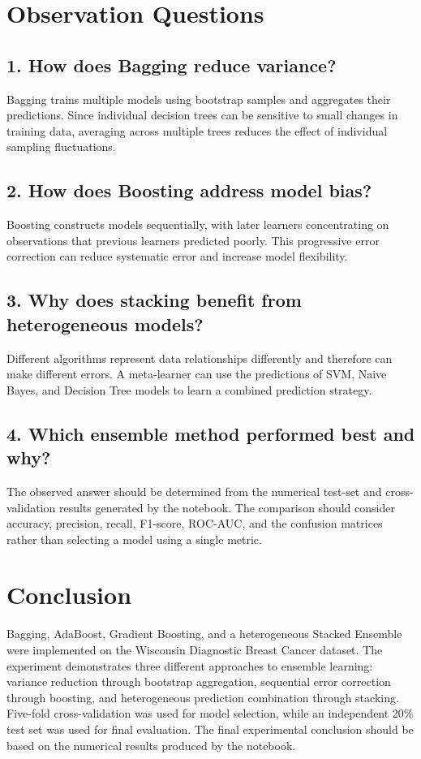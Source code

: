 \documentclass[12pt,a4paper]{article}
\begin{document}
\section{Observation Questions}

\subsection*{1. How does Bagging reduce variance?}
Bagging trains multiple models using bootstrap samples and aggregates their predictions. Since individual decision trees can be sensitive to small changes in training data, averaging across multiple trees reduces the effect of individual sampling fluctuations.

\subsection*{2. How does Boosting address model bias?}
Boosting constructs models sequentially, with later learners concentrating on observations that previous learners predicted poorly. This progressive error correction can reduce systematic error and increase model flexibility.

\subsection*{3. Why does stacking benefit from heterogeneous models?}
Different algorithms represent data relationships differently and therefore can make different errors. A meta-learner can use the predictions of SVM, Naive Bayes, and Decision Tree models to learn a combined prediction strategy.

\subsection*{4. Which ensemble method performed best and why?}
The observed answer should be determined from the numerical test-set and cross-validation results generated by the notebook. The comparison should consider accuracy, precision, recall, F1-score, ROC-AUC, and the confusion matrices rather than selecting a model using a single metric.

\section{Conclusion}
Bagging, AdaBoost, Gradient Boosting, and a heterogeneous Stacked Ensemble were implemented on the Wisconsin Diagnostic Breast Cancer dataset. The experiment demonstrates three different approaches to ensemble learning: variance reduction through bootstrap aggregation, sequential error correction through boosting, and heterogeneous prediction combination through stacking. Five-fold cross-validation was used for model selection, while an independent 20\% test set was used for final evaluation. The final experimental conclusion should be based on the numerical results produced by the notebook.
\end{document}
